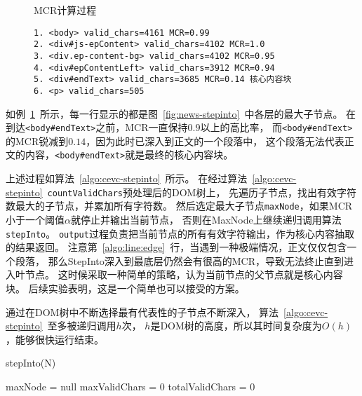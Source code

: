 \begin{figure}[htbp]
\begin{example}
\label{ex:mcr}
MCR计算过程
\end{example}
\begin{verbatim}
1. <body> valid_chars=4161 MCR=0.99
2. <div#js-epContent> valid_chars=4102 MCR=1.0
3. <div.ep-content-bg> valid_chars=4102 MCR=0.95
4. <div#epContentLeft> valid_chars=3912 MCR=0.94
5. <div#endText> valid_chars=3685 MCR=0.14 核心内容块
6. <p> valid_chars=505
\end{verbatim}
\end{figure}

如例~\ref{ex:mcr}~所示，每一行显示的都是图~\ref{fig:news-stepinto}~中各层的最大子节点。
在到达\texttt{<body\#endText>}之前，MCR一直保持$0.9$以上的高比率，
而\texttt{<body\#endText>}的MCR锐减到$0.14$，因为此时已深入到正文的一个段落中，
这个段落无法代表正文的内容，\texttt{<body\#endText>}就是最终的核心内容块。

上述过程如算法~\ref{algo:cevc-stepinto}~所示。
在经过算法~\ref{algo:cevc-stepinto}~\texttt{countValidChars}预处理后的DOM树上，
先遍历子节点，找出有效字符数最大的子节点，并累加所有字符数。
然后选定最大子节点\texttt{maxNode}，如果MCR小于一个阈值$\alpha$就停止并输出当前节点，
否则在MaxNode上继续递归调用算法\texttt{stepInto}。
\texttt{output}过程负责把当前节点的所有有效字符输出，作为核心内容抽取的结果返回。
注意第~\ref{algo:line:edge}~行，当遇到一种极端情况，正文仅仅包含一个段落，
那么StepInto深入到最底层仍然会有很高的MCR，导致无法终止直到进入叶节点。
这时候采取一种简单的策略，认为当前节点的父节点就是核心内容块。
后续实验表明，这是一个简单也可以接受的方案。

通过在DOM树中不断选择最有代表性的子节点不断深入，
算法~\ref{algo:cevc-stepinto}~至多被递归调用$h$次，
$h$是DOM树的高度，所以其时间复杂度为$O(h)$，能够很快运行结束。

\begin{algorithm}[htbp]
\caption{stepInto(N)}
\label{algo:cevc-stepinto}

maxNode = null \;
maxValidChars = 0 \;
totalValidChars = 0 \;

\end{algorithm}

